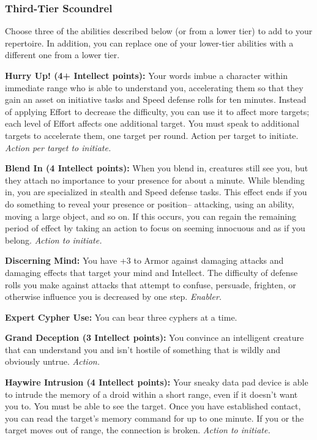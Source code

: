 \documentclass[a4paper,10pt,final,twocolumn,oneside]{book}
\newcommand{\itemAbility}[2]{\textcolor{25gray}{\textbullet\textbf{ #1:}}{ #2}\par}
\newcommand{\enabler}{\textit{ Enabler.}}
\newcommand{\action}{\textit{ Action.}}
\newcommand{\actionInit}{\textit{ Action to initiate.}}
\newcommand{\actionInitTarget}{\textit{ Action per target to initiate.}}
\begin{document}

\subsubsection*{Third-Tier Scoundrel}
\label{subsub:scoundrelThirdTier}

Choose three of the abilities described below (or from a lower tier) to add to your repertoire. In addition, you can replace one of your lower-tier abilities with a different one from a lower tier.

\itemAbility{Hurry Up! (4+ Intellect points)}{Your words imbue a character within immediate range who is able to understand you, accelerating them so that they gain an asset on initiative tasks and Speed defense rolls for ten minutes. Instead of applying Effort to decrease the difficulty, you can use it to affect more targets; each level of Effort affects one additional target. You must speak to additional targets to accelerate them, one target per round. Action per target to initiate.\actionInitTarget}

\itemAbility{Blend In (4 Intellect points)}{When you blend in, creatures still see you, but they attach no importance to your presence for about a minute. While blending in, you are specialized in stealth and Speed defense tasks. This effect ends if you do something to reveal your presence or position-- attacking, using an ability, moving a large object, and so on. If this occurs, you can regain the remaining period of effect by taking an action to focus on seeming innocuous and as if you belong.\actionInit}

\itemAbility{Discerning Mind}{You have +3 to Armor against damaging attacks and damaging effects that target your mind and Intellect. The difficulty of defense rolls you make against attacks that attempt to confuse, persuade, frighten, or otherwise influence you is decreased by one step.\enabler}

\itemAbility{Expert Cypher Use}{You can bear three cyphers at a time.}

\itemAbility{Grand Deception (3 Intellect points)}{You convince an intelligent creature that can understand you and isn’t hostile of something that is wildly and obviously untrue.\action}

\itemAbility{Haywire Intrusion (4 Intellect points)}{ Your sneaky data pad device is able to intrude the memory of a droid within a short range, even if it doesn’t want you to. You must be able to see the target. Once you have established contact, you can read the target’s memory command for up to one minute. If you or the target moves out of range, the connection is broken.\actionInit}
\end{document}
